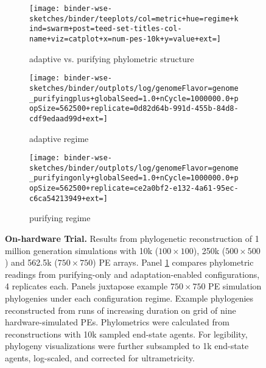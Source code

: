\begin{figure}

\begin{subfigure}[c]{\linewidth}
    \texttt{[image: binder-wse-sketches/binder/teeplots/col=metric+hue=regime+kind=swarm+post=teed-set-titles-col-name+viz=catplot+x=num-pes-10k+y=value+ext=]}
 \caption{\footnotesize adaptive vs. purifying phylometric structure}
  \label{fig:on-device-phylometrics}
\end{subfigure}

\begin{subfigure}[c]{0.5\linewidth}
  \centering
  \texttt{[image: binder-wse-sketches/binder/outplots/log/genomeFlavor=genome\_purifyingplus+globalSeed=1.0+nCycle=1000000.0+popSize=562500+replicate=0d82d64b-991d-455b-84d8-cdf9edaad99d+ext=]}
  \footnotesize
 \caption{\footnotesize adaptive regime}
  \label{fig:on-device-adaptive}
\end{subfigure}%
\begin{subfigure}[c]{0.5\linewidth}
  \centering
  \texttt{[image: binder-wse-sketches/binder/outplots/log/genomeFlavor=genome\_purifyingonly+globalSeed=1.0+nCycle=1000000.0+popSize=562500+replicate=ce2a0bf2-e132-4a61-95ec-c6ca54213949+ext=]}
  \footnotesize
 \caption{\footnotesize purifying regime}
  \label{fig:on-device-purifying}
\end{subfigure}

\vspace{-1.5ex}

\caption{%
\textbf{On-hardware Trial.}
\footnotesize
Results from phylogenetic reconstruction of 1 million generation simulations with 10k ($100\times100$), 250k ($500\times500$) and 562.5k ($750\times750$) PE arrays.
Panel \ref{fig:on-device-phylometrics} compares phylometric readings from purifying-only and adaptation-enabled configurations, 4 replicates each.
Panels  juxtapose example $750\times750$ PE simulation phylogenies under each configuration regime.
Example phylogenies reconstructed from runs of increasing duration on grid of nine hardware-simulated PEs.
Phylometrics were calculated from reconstructions with 10k sampled end-state agents.
For legibility, phylogeny visualizations were further subsampled to 1k end-state agents, log-scaled, and corrected for ultrametricity.
}
\label{fig:on-device}
\vspace{-0.2in}
\end{figure}
